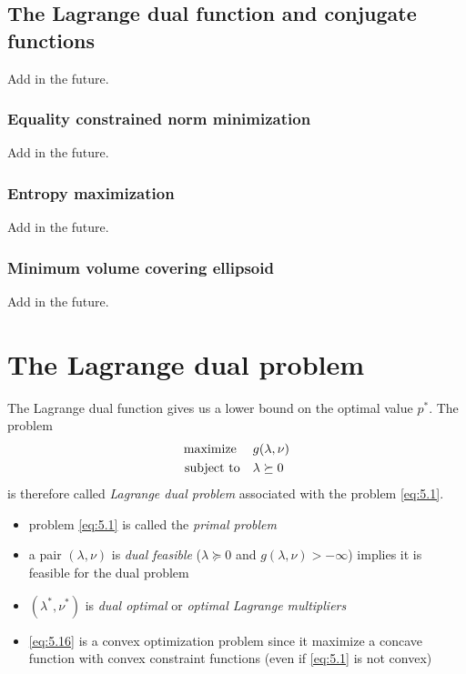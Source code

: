 \subsection{The Lagrange dual function and conjugate functions}
Add in the future.
\subsubsection{Equality constrained norm minimization}
Add in the future.
\subsubsection{Entropy maximization}                                                                                                                                                                                                                                                                                                                                                                                                                                                                                                                                                                                                                                                                                                                                                                                                                                                                                                                                                                   
Add in the future.
\subsubsection{Minimum volume covering ellipsoid}
Add in the future.

\section{The Lagrange dual problem}
The Lagrange dual function gives us a lower bound on the optimal value $p^\ast$. The problem
\begin{align}
  \text{maximize\;}\quad& g(\lambda,\nu)\nonumber\\
  \text{subject to}\quad& \lambda\succeq 0\label{eq:5.16}
\end{align}
is therefore called \textit{Lagrange dual problem} associated with the problem \eqref{eq:5.1}.
\begin{itemize}
  \item problem \eqref{eq:5.1} is called the \textit{primal problem}
  \item a pair $(\lambda,\nu)$ is \textit{dual feasible} ($\lambda\succeq 0$ and $g(\lambda,\nu)>-\infty$) implies it is feasible for the dual problem
  \item $(\lambda^\ast,\nu^\ast)$ is \textit{dual optimal} or \textit{optimal Lagrange multipliers}
  \item \eqref{eq:5.16} is a convex optimization problem since it maximize a concave function with convex constraint functions (even if \eqref{eq:5.1} is not convex)
\end{itemize}

